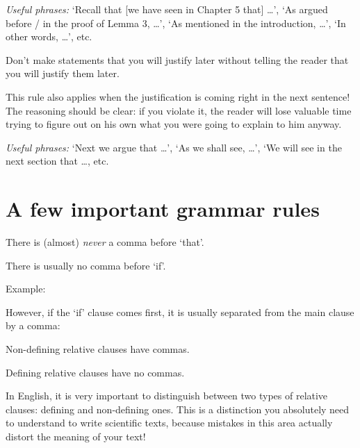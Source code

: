 \emph{Useful phrases:} `Recall that [we have seen in Chapter 5 that]
\ldots', `As argued before / in the proof of Lemma 3, \ldots', `As
mentioned in the introduction, \ldots', `In other words, \ldots', etc.

\begin{Rule}
  Don't make statements that you will justify later without telling
  the reader that you will justify them later.
\end{Rule}

This rule also applies when the justification is coming right in the
next sentence!  The reasoning should be clear: if you violate it, the
reader will lose valuable time trying to figure out on his own what
you were going to explain to him anyway.

\emph{Useful phrases:} `Next we argue that \ldots', `As we shall see,
\ldots', `We will see in the next section that \ldots, etc.


\section{A few important grammar rules}

\begin{Rule}
  \label{rule:no-comma-before-that}
  There is (almost) \emph{never} a comma before `that'.
\end{Rule}


\begin{Rule}
  There is usually no comma before `if'.
\end{Rule}

Example:

However, if the `if' clause comes first, it is usually separated from
the main clause by a comma:




\begin{Rule}
  \label{rule:non-defining-has-comma}
  Non-defining relative clauses have commas.
\end{Rule}
\begin{Rule}
  \label{rule:defining-without-comma}
  Defining relative clauses have no commas.
\end{Rule}

In English, it is very important to distinguish between two types of
relative clauses: defining and non-defining ones. This is a
distinction you absolutely need to understand to write scientific
texts, because mistakes in this area actually distort the meaning of
your text!

